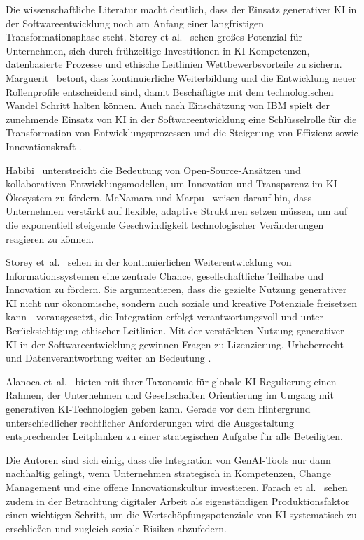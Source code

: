 Die wissenschaftliche Literatur macht deutlich, dass der Einsatz generativer KI
in der Softwareentwicklung noch am Anfang einer langfristigen
Transformationsphase steht. Storey et al.~\cite{storey_generative_2025} sehen
großes Potenzial für Unternehmen, sich durch frühzeitige Investitionen in
KI-Kompetenzen, datenbasierte Prozesse und ethische Leitlinien
Wettbewerbsvorteile zu sichern. Marguerit~\cite{marguerit_augmenting_2025}
betont, dass kontinuierliche Weiterbildung und die Entwicklung neuer
Rollenprofile entscheidend sind, damit Beschäftigte mit dem technologischen
Wandel Schritt halten können. Auch nach Einschätzung von IBM spielt der
zunehmende Einsatz von KI in der Softwareentwicklung eine Schlüsselrolle für
die Transformation von Entwicklungsprozessen und die Steigerung von Effizienz
sowie Innovationskraft \cite{a_ki_2024}.

Habibi~\cite{habibi_open_2025} unterstreicht die Bedeutung von
Open-Source-Ansätzen und kollaborativen Entwicklungsmodellen, um Innovation und
Transparenz im KI-Ökosystem zu fördern. McNamara und
Marpu~\cite{mcnamara_exponential_2025} weisen darauf hin, dass Unternehmen
verstärkt auf flexible, adaptive Strukturen setzen müssen, um auf die
exponentiell steigende Geschwindigkeit technologischer Veränderungen reagieren
zu können.

Storey et~al.~\cite{storey_generative_2025} sehen in der kontinuierlichen
Weiterentwicklung von Informationssystemen eine zentrale Chance,
gesellschaftliche Teilhabe und Innovation zu fördern. Sie argumentieren, dass
die gezielte Nutzung generativer KI nicht nur ökonomische, sondern auch soziale
und kreative Potenziale freisetzen kann - vorausgesetzt, die Integration
erfolgt verantwortungsvoll und unter Berücksichtigung ethischer Leitlinien. Mit
der verstärkten Nutzung generativer KI in der Softwareentwicklung gewinnen
Fragen zu Lizenzierung, Urheberrecht und Datenverantwortung weiter an Bedeutung
\cite{stalnaker_developer_2025}.

Alanoca et~al.~\cite{alanoca_comparing_2025} bieten mit ihrer Taxonomie für
globale KI-Regulierung einen Rahmen, der Unternehmen und Gesellschaften
Orientierung im Umgang mit generativen KI-Technologien geben kann. Gerade vor
dem Hintergrund unterschiedlicher rechtlicher Anforderungen wird die
Ausgestaltung entsprechender Leitplanken zu einer strategischen Aufgabe für
alle Beteiligten.

Die Autoren sind sich einig, dass die Integration von GenAI-Tools nur dann
nachhaltig gelingt, wenn Unternehmen strategisch in Kompetenzen, Change
Management und eine offene Innovationskultur investieren. Farach et
al.~\cite{farach_evolving_2025} sehen zudem in der Betrachtung digitaler Arbeit
als eigenständigen Produktionsfaktor einen wichtigen Schritt, um die
Wertschöpfungspotenziale von KI systematisch zu erschließen und zugleich
soziale Risiken abzufedern.

